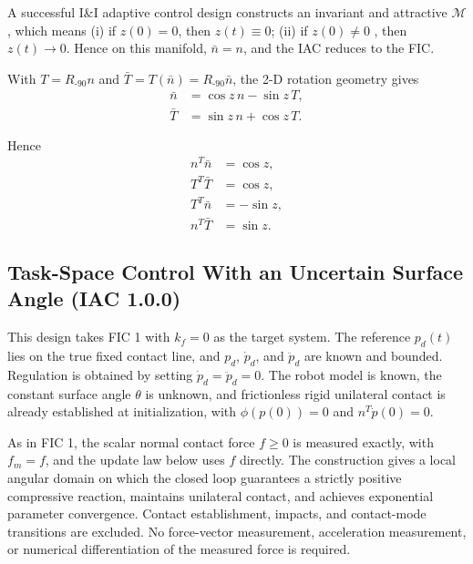\documentclass[10pt,journal,letterpaper]{IEEEtran}
\begin{document}
A successful I\&I adaptive control design constructs an invariant and attractive $\mathcal M$, which means (i) if $z(0)=0$, then $z(t)\equiv{0}$; (ii) if $z(0)\neq{0}$ , then $z(t)\to{0}$. Hence on this manifold, $\bar n=n$, and the IAC reduces to the FIC.

With $T=R_{\text{-90}}n$ and $\bar T=T(\bar n)=R_{\text{-90}}\bar n$, the 2-D rotation geometry gives
\begin{equation}\label{eq:rotated-geometry}
\begin{aligned}
\bar n&=\cos z\,n-\sin z\,T,\\
\bar T&=\sin z\,n+\cos z\,T.
\end{aligned}
\end{equation}

Hence
\begin{equation}\label{eq:geometry-identities}
\begin{aligned}
n^T\bar n&=\cos z,\\
T^T\bar T&=\cos z,\\
T^T\bar n&=-\sin z,\\
n^T\bar T&=\sin z.
\end{aligned}
\end{equation}

\subsection{Task-Space Control With an Uncertain Surface Angle (IAC 1.0.0)}

This design takes FIC 1 with $k_f=0$ as the target system. The reference $p_d(t)$ lies on the true fixed contact line, and $p_d$, $\dot p_d$, and $\ddot p_d$ are known and bounded. Regulation is obtained by setting $\dot p_d=\ddot p_d=0$. The robot model is known, the constant surface angle $\theta$ is unknown, and frictionless rigid unilateral contact is already established at initialization, with $\phi(p(0))=0$ and $n^T\dot p(0)=0$.

As in FIC 1, the scalar normal contact force $f\geq0$ is measured exactly, with $f_m=f$, and the update law below uses $f$ directly. The construction gives a local angular domain on which the closed loop guarantees a strictly positive compressive reaction, maintains unilateral contact, and achieves exponential parameter convergence. Contact establishment, impacts, and contact-mode transitions are excluded. No force-vector measurement, acceleration measurement, or numerical differentiation of the measured force is required.
\end{document}
